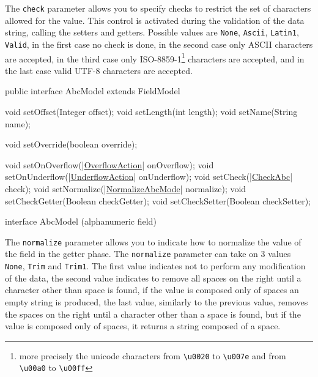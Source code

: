 \documentclass[a4paper,10pt]{report}
\newenvironment{elisting}[1][H]
  {\captionsetup{aboveskip=0pt}\begin{listing}[#1]}
  {\end{listing}%
}
\begin{document}
The \hypertarget{abc:chk}{\texttt{check}} parameter allows you to specify checks 
to restrict the set of characters allowed for the value. This control is 
activated during the validation of the data string, calling the setters and 
getters. 
Possible values are \verb!None!, \verb!Ascii!, \verb!Latin1!, \verb!Valid!, in 
the first case no check is done, in the second case only ASCII characters are 
accepted, in the third case only ISO-8859-1\footnote{%
more precisely the unicode characters from \texttt{\textbackslash u0020} to 
\texttt{\textbackslash u007e} and from \texttt{\textbackslash u00a0} to 
\texttt{\textbackslash u00ff}
} characters are accepted, and in the last case valid UTF-8 characters are 
accepted.

\begin{elisting}[!htb]
\begin{javacode}
public interface AbcModel extends FieldModel {
    void setOffset(Integer offset);
    void setLength(int length);
    void setName(String name);

    void setOverride(boolean override);

    void setOnOverflow(|\hyperref[lst:OverflowAction]{OverflowAction}| onOverflow);
    void setOnUnderflow(|\hyperref[lst:UnderflowAction]{UnderflowAction}| onUnderflow);
    void setCheck(|\hyperref[lst:CheckAbc]{CheckAbc}| check);
    void setNormalize(|\hyperref[lst:NormalizeAbcMode]{NormalizeAbcMode}| normalize);
    void setCheckGetter(Boolean checkGetter);
    void setCheckSetter(Boolean checkSetter);
}
\end{javacode}
\caption{interface AbcModel (alphanumeric field)}
\label{lst:AbcModel}
\end{elisting}

The \hypertarget{abc:nrm}{\texttt{normalize}} parameter allows you to indicate 
how to normalize the value of the field in the getter phase. 
The \verb!normalize! parameter can take on 3 values \verb!None!, \verb!Trim! 
and \verb!Trim1!. The first value indicates not to perform any modification of 
the data, the second value indicates to remove all spaces on the right until a 
character other than space is found, if the value is composed only of spaces an 
empty string is produced, the last value, similarly to the previous value, 
removes the spaces on the right until a character other than a space is found, 
but if the value is composed only of spaces, it returns a string composed of a 
space.
\end{document}
